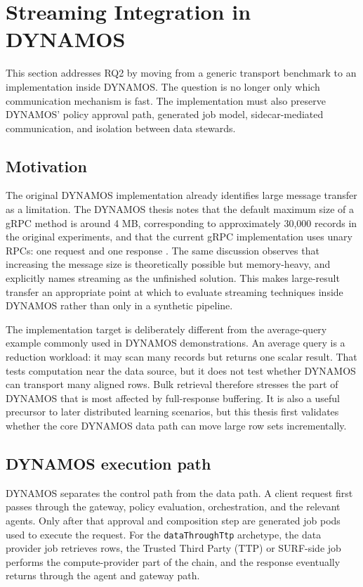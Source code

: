 \section{Streaming Integration in DYNAMOS}
\label{sec:dynamos-rq2}

This section addresses RQ2 by moving from a generic transport benchmark to an implementation inside DYNAMOS. The question is no longer only which communication mechanism is fast. The implementation must also preserve DYNAMOS' policy approval path, generated job model, sidecar-mediated communication, and isolation between data stewards.

\subsection{Motivation}

The original DYNAMOS implementation already identifies large message transfer as a limitation. The DYNAMOS thesis notes that the default maximum size of a gRPC method is around 4 MB, corresponding to approximately 30{,}000 records in the original experiments, and that the current gRPC implementation uses unary RPCs: one request and one response \cite{stutterheim2023thesis}. The same discussion observes that increasing the message size is theoretically possible but memory-heavy, and explicitly names streaming as the unfinished solution. This makes large-result transfer an appropriate point at which to evaluate streaming techniques inside DYNAMOS rather than only in a synthetic pipeline.

The implementation target is deliberately different from the average-query example commonly used in DYNAMOS demonstrations. An average query is a reduction workload: it may scan many records but returns one scalar result. That tests computation near the data source, but it does not test whether DYNAMOS can transport many aligned rows. Bulk retrieval therefore stresses the part of DYNAMOS that is most affected by full-response buffering. It is also a useful precursor to later distributed learning scenarios, but this thesis first validates whether the core DYNAMOS data path can move large row sets incrementally.

\subsection{DYNAMOS execution path}

DYNAMOS separates the control path from the data path. A client request first passes through the gateway, policy evaluation, orchestration, and the relevant agents. Only after that approval and composition step are generated job pods used to execute the request. For the \texttt{dataThroughTtp} archetype, the data provider job retrieves rows, the Trusted Third Party (TTP) or SURF-side job performs the compute-provider part of the chain, and the response eventually returns through the agent and gateway path.

